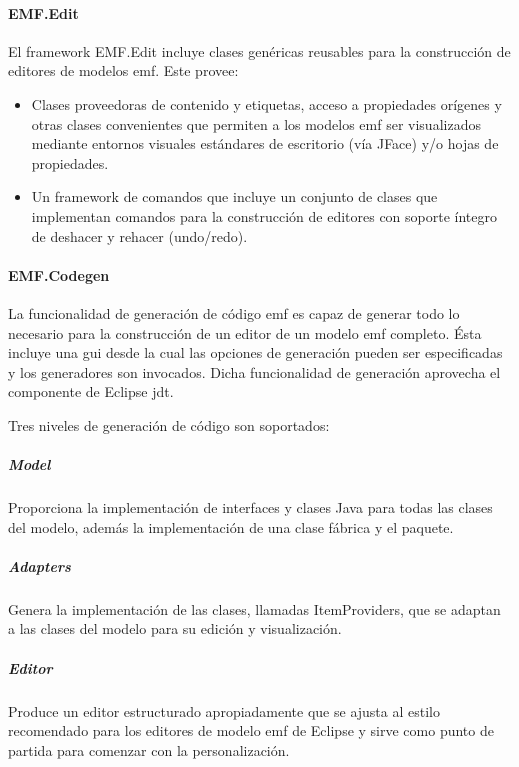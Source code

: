 \documentclass[a4paper,12pt,oneside,spanish]{book}
\begin{document}
\paragraph{EMF.Edit}

El framework EMF.Edit incluye clases genéricas reusables para la construcción de editores de modelos \gls{emf}. Este provee:

\begin{itemize}

\item Clases proveedoras de contenido y etiquetas, acceso a propiedades orígenes y otras clases convenientes que permiten a los modelos \gls{emf} ser visualizados mediante entornos visuales estándares de escritorio (vía JFace) y/o hojas de propiedades.

\item Un framework de comandos que incluye un conjunto de clases que implementan comandos para la construcción de editores con soporte íntegro de deshacer y rehacer (undo/redo).

\end{itemize}

\paragraph{EMF.Codegen}

La funcionalidad de generación de código \gls{emf} es capaz de generar todo lo necesario para la construcción de un editor de un modelo \gls{emf} completo. Ésta incluye una \gls{gui} desde la cual las opciones de generación pueden ser especificadas y los generadores son invocados. Dicha funcionalidad de generación aprovecha el componente de Eclipse \gls{jdt}.

Tres niveles de generación de código son soportados:

\subparagraph{Model}

Proporciona la implementación de interfaces y clases Java para todas las clases del modelo, además la implementación de una clase fábrica y el paquete.

\subparagraph{Adapters}

Genera la implementación de las clases, llamadas ItemProviders, que se adaptan a las clases del modelo para su edición y visualización.

\subparagraph{Editor}

Produce un editor estructurado apropiadamente que se ajusta al estilo recomendado para los editores de modelo \gls{emf} de Eclipse y sirve como punto de partida para comenzar con la personalización.
\end{document}
